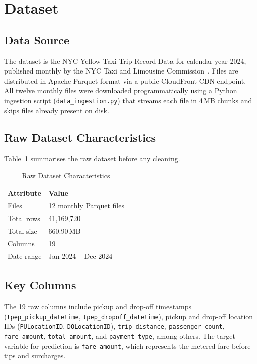 \documentclass[conference]{IEEEtran}
\begin{document}
\section{Dataset}
\label{sec:dataset}

\subsection{Data Source}

The dataset is the NYC Yellow Taxi Trip Record Data for calendar
year 2024, published monthly by the NYC Taxi and Limousine
Commission~\cite{tlc2024}. Files are distributed in Apache Parquet
format via a public CloudFront CDN endpoint. All twelve monthly
files were downloaded programmatically using a Python ingestion
script (\texttt{data\_ingestion.py}) that streams each file in
4\,MB chunks and skips files already present on disk.

\subsection{Raw Dataset Characteristics}

Table~\ref{tab:raw} summarises the raw dataset before any cleaning.

\begin{table}[h]
\caption{Raw Dataset Characteristics}
\label{tab:raw}
\centering
\begin{tabular}{ll}
\toprule
\textbf{Attribute} & \textbf{Value} \\
\midrule
Files             & 12 monthly Parquet files \\
Total rows        & 41,169,720 \\
Total size        & 660.90\,MB \\
Columns           & 19 \\
Date range        & Jan 2024 -- Dec 2024 \\
\bottomrule
\end{tabular}
\end{table}

\subsection{Key Columns}

The 19 raw columns include pickup and drop-off timestamps
(\texttt{tpep\_pickup\_datetime}, \texttt{tpep\_dropoff\_datetime}),
pickup and drop-off location IDs (\texttt{PULocationID},
\texttt{DOLocationID}), \texttt{trip\_distance},
\texttt{passenger\_count}, \texttt{fare\_amount},
\texttt{total\_amount}, and \texttt{payment\_type}, among others.
The target variable for prediction is \texttt{fare\_amount}, which
represents the metered fare before tips and surcharges.
\end{document}
